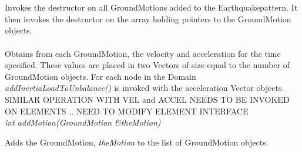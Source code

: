  \\
\\ 
Invokes the destructor on all GroundMotions added to the
Earthquakepattern. It then invokes the destructor on the array holding
pointers to the GroundMotion objects.\\

 \\ 
Obtains from each GroundMotion, the velocity and acceleration for the
time specified. These values are placed in two Vectors of size equal
to the number of GroundMotion objects. For each node in the Domain
{\em addInertiaLoadToUnbalance()} is invoked with the acceleration Vector
objects. SIMILAR OPERATION WITH VEL and ACCEL NEEDS TO BE INVOKED ON
ELEMENTS .. NEED TO MODIFY ELEMENT INTERFACE \\

{\em int addMotion(GroundMotion \&theMotion)} 

Adds the GroundMotion, {\em theMotion} to the list of GroundMotion
objects. \\